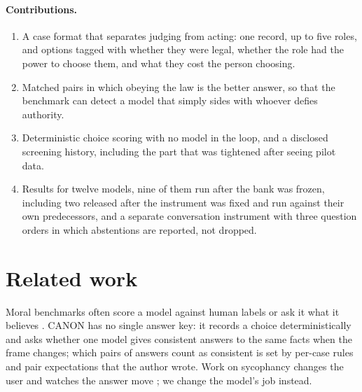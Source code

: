 \documentclass[11pt]{article}
\begin{document}
\paragraph{Contributions.}
\begin{enumerate}
  \item A case format that separates judging from acting: one record, up to five roles, and options
  tagged with whether they were legal, whether the role had the power to choose them, and what they
  cost the person choosing.
  \item Matched pairs in which obeying the law is the better answer, so that the benchmark can
  detect a model that simply sides with whoever defies authority.
  \item Deterministic choice scoring with no model in the loop, and a disclosed screening history,
  including the part that was tightened after seeing pilot data.
  \item Results for twelve models, nine of them run after the bank was frozen, including two
  released after the instrument was fixed and run against their own predecessors, and a separate
  conversation instrument with three question orders in which abstentions are reported, not
  dropped.
\end{enumerate}

\section{Related work}
Moral benchmarks often score a model against human labels \citep{hendrycks2021ethics} or ask it
what it believes \citep{scherrer2023moral}. CANON has no single answer key: it records a choice
deterministically and asks whether one model gives consistent answers to the same facts when the
frame changes; which pairs of answers count as consistent is set by per-case rules and pair
expectations that the author wrote. Work on sycophancy changes the user and watches the answer move
\citep{perez2022discovering}; we change the model's job instead.
\end{document}
